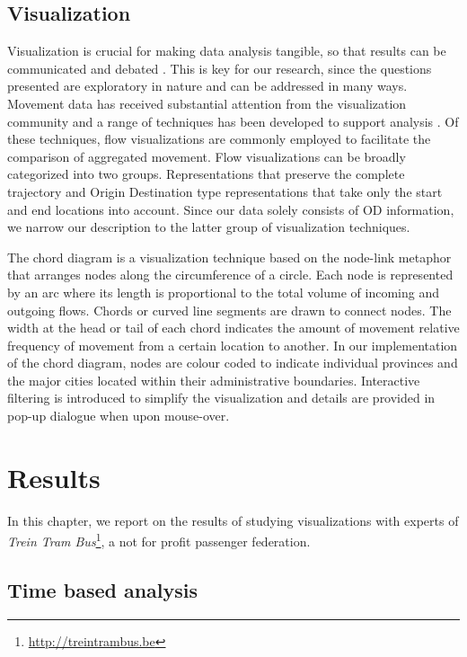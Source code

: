 \documentclass{sig-alternate}
\newcommand{\todo}[1]{\noindent\textcolor{red}{{\bf \{TODO}: #1{\bf \}}}}
\begin{document}
\subsection{Visualization}

Visualization is crucial for making data analysis tangible, so that results can be communicated and debated \cite{robinson2008collaborative}. 
This is key for our research, since the questions presented are exploratory in nature \cite{kraak2008exploratory} and can be addressed in many ways. 
Movement data has received substantial attention from the visualization community and a range of techniques has been developed to support analysis \cite{andrienko2012visual}. 
Of these techniques, flow visualizations are commonly employed to facilitate the comparison of aggregated movement. 
Flow visualizations can be broadly categorized into two groups. Representations that preserve the complete trajectory and Origin Destination type representations that take only the start and end locations into account.
Since our data solely consists of OD information, we narrow our description to the latter group of visualization techniques.

The chord diagram is a visualization technique based on the node-link metaphor that arranges nodes along the circumference of a circle. 
Each node is represented by an arc where its length is proportional to the total volume of incoming and outgoing flows. 
Chords or curved line segments are drawn to connect nodes. 
The width at the head or tail of each chord indicates the amount of movement relative frequency of movement from a certain location to another.
In our implementation of the chord diagram, nodes are colour coded to indicate individual provinces and the major cities located within their administrative boundaries. 
Interactive filtering is introduced to simplify the visualization and details are provided in pop-up dialogue when upon mouse-over.

\section{Results}
\label{sec:results}

In this chapter, we report on the results of studying visualizations with experts of \emph{Trein Tram Bus}\footnote{\url{http://treintrambus.be}}, a not for profit passenger federation.

\subsection{Time based analysis}
\end{document}

